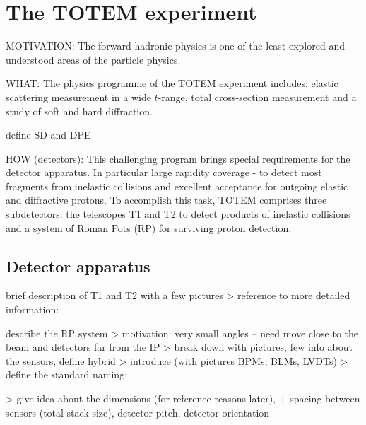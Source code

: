 \iffalse
TOTEM, RP, T1, T2, IP, BPM, BLM
\fi

\chapter[ttm]{The TOTEM experiment}

MOTIVATION: The forward hadronic physics is one of the least explored and understood areas of the particle physics.

WHAT: The physics programme of the TOTEM experiment includes:
\> elastic scattering measurement in a wide $t$-range,
\> total cross-section measurement and
\> a study of soft and hard diffraction.

\> define SD and DPE


HOW (detectors): This challenging program brings special requirements for the detector apparatus. In particular large rapidity coverage - to detect most fragments from inelastic collisions and excellent acceptance for outgoing elastic and diffractive protons. To accomplish this task, TOTEM comprises three subdetectors: the telescopes T1 and T2 to detect products of inelastic collisions and a system of Roman Pots (RP) for surviving proton detection.


\section[ttm det]{Detector apparatus}

\> brief description of T1 and T2 with a few pictures
\>> reference to more detailed information: 

\> describe the RP system
\>> motivation: very small angles -- need move close to the beam and detectors far from the IP
\>> break down with pictures, few info about the sensors, define hybrid
\>> introduce (with pictures BPMs, BLMs, LVDTs)
\>> define the standard naming: 


\>> give idea about the dimensions (for reference reasons later), + spacing between sensors (total stack size), detector pitch, detector orientation

